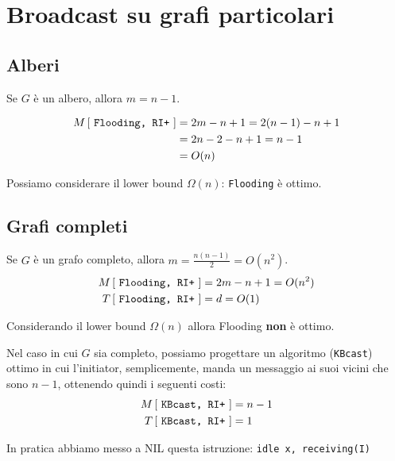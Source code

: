 \section{Broadcast su grafi particolari}

\subsection{Alberi}
Se $G$ è un albero, allora $m=n-1$.

\begin{equation*}
    \begin{split}
        M \left[ \text{ \texttt{Flooding, RI+} } \right]  & = 2m -n+1 = 2(n-1) -n+1\\
        &=  2n-2-n+1 = n-1\\
        &= O(n)
    \end{split}
\end{equation*}

Possiamo considerare il lower bound $\Omega(n)$: \texttt{Flooding} è ottimo.

\subsection{Grafi completi}
Se $G$ è un grafo completo, allora $m = \frac{n(n-1)}{2} = O(n^2)$.
\begin{equation*}
    \begin{split}
        M \left[ \text{ \texttt{Flooding, RI+} } \right] & = 2m-n+1 = O(n^2)\\
        T \left[ \text{ \texttt{Flooding, RI+} } \right] & = d = O(1)
    \end{split}
\end{equation*}

Considerando il lower bound $\Omega(n)$ allora Flooding \textbf{non} è ottimo.

Nel caso in cui $G$ sia completo, possiamo progettare un algoritmo
(\texttt{KBcast}) ottimo in cui l'initiator, semplicemente, manda un messaggio
ai suoi vicini che sono $n-1$, ottenendo quindi i seguenti costi:
\begin{equation*}
    \begin{split}
        M \left[ \text{ \texttt{KBcast, RI+} } \right] & = n-1\\
        T \left[ \text{ \texttt{KBcast, RI+} } \right] & = 1
    \end{split}
\end{equation*}

In pratica abbiamo messo a NIL questa istruzione: \texttt{idle x, receiving(I)}

